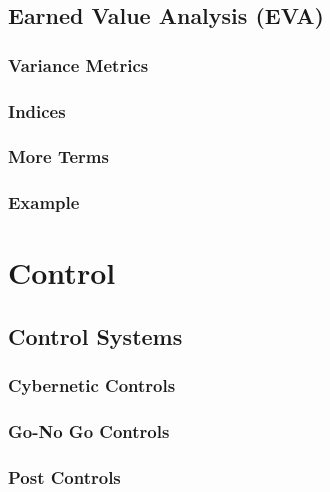     \section{Earned Value Analysis (EVA)} %

        \subsection{Variance Metrics} %

        \subsection{Indices} %

        \subsection{More Terms} %

        \subsection{Example} %

\chapter{Control} %

    \section{Control Systems} %

        \subsection{Cybernetic Controls} %

        \subsection{Go-No Go Controls} %

        \subsection{Post Controls} %

